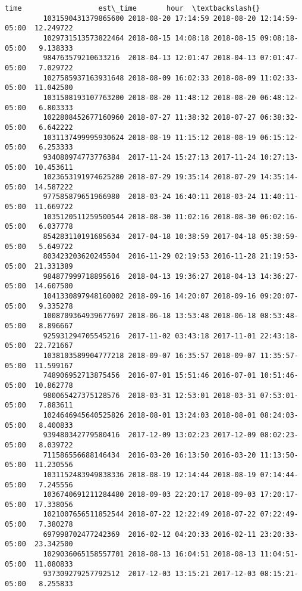 \documentclass[11pt]{article}
\begin{document}
\begin{Verbatim}[commandchars=\\\{\}]
                                            time                  est\_time       hour  \textbackslash{}
         1031590431379865600 2018-08-20 17:14:59 2018-08-20 12:14:59-05:00  12.249722   
         1029731513573822464 2018-08-15 14:08:18 2018-08-15 09:08:18-05:00   9.138333   
         984763579210633216  2018-04-13 12:01:47 2018-04-13 07:01:47-05:00   7.029722   
         1027585937163931648 2018-08-09 16:02:33 2018-08-09 11:02:33-05:00  11.042500   
         1031508193107763200 2018-08-20 11:48:12 2018-08-20 06:48:12-05:00   6.803333   
         1022808452677160960 2018-07-27 11:38:32 2018-07-27 06:38:32-05:00   6.642222   
         1031137499995930624 2018-08-19 11:15:12 2018-08-19 06:15:12-05:00   6.253333   
         934080974773776384  2017-11-24 15:27:13 2017-11-24 10:27:13-05:00  10.453611   
         1023653191974625280 2018-07-29 19:35:14 2018-07-29 14:35:14-05:00  14.587222   
         977585879651966980  2018-03-24 16:40:11 2018-03-24 11:40:11-05:00  11.669722   
         1035120511259500544 2018-08-30 11:02:16 2018-08-30 06:02:16-05:00   6.037778   
         854283110191685634  2017-04-18 10:38:59 2017-04-18 05:38:59-05:00   5.649722   
         803423203620245504  2016-11-29 02:19:53 2016-11-28 21:19:53-05:00  21.331389   
         984877999718895616  2018-04-13 19:36:27 2018-04-13 14:36:27-05:00  14.607500   
         1041330897948160002 2018-09-16 14:20:07 2018-09-16 09:20:07-05:00   9.335278   
         1008709364939677697 2018-06-18 13:53:48 2018-06-18 08:53:48-05:00   8.896667   
         925931294705545216  2017-11-02 03:43:18 2017-11-01 22:43:18-05:00  22.721667   
         1038103589904777218 2018-09-07 16:35:57 2018-09-07 11:35:57-05:00  11.599167   
         748906952713875456  2016-07-01 15:51:46 2016-07-01 10:51:46-05:00  10.862778   
         980065427375128576  2018-03-31 12:53:01 2018-03-31 07:53:01-05:00   7.883611   
         1024646945640525826 2018-08-01 13:24:03 2018-08-01 08:24:03-05:00   8.400833   
         939480342779580416  2017-12-09 13:02:23 2017-12-09 08:02:23-05:00   8.039722   
         711586556688146434  2016-03-20 16:13:50 2016-03-20 11:13:50-05:00  11.230556   
         1031152483949838336 2018-08-19 12:14:44 2018-08-19 07:14:44-05:00   7.245556   
         1036740691211284480 2018-09-03 22:20:17 2018-09-03 17:20:17-05:00  17.338056   
         1021007656511852544 2018-07-22 12:22:49 2018-07-22 07:22:49-05:00   7.380278   
         697998702477242369  2016-02-12 04:20:33 2016-02-11 23:20:33-05:00  23.342500   
         1029036065158557701 2018-08-13 16:04:51 2018-08-13 11:04:51-05:00  11.080833   
         937309279257792512  2017-12-03 13:15:21 2017-12-03 08:15:21-05:00   8.255833   

\end{Verbatim}
\end{document}
